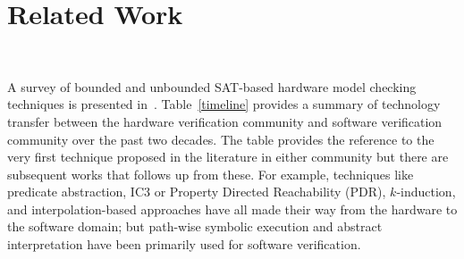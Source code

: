 \section{Related Work}~\label{related_work}
%



A survey of bounded and unbounded SAT-based hardware model checking techniques 
is presented in~\cite{charme05}.
Table~\ref{timeline} provides a summary of technology transfer between the 
hardware verification community and software verification community over the past 
two decades.  The table provides the reference to the very first technique proposed 
in the literature in either community but there are subsequent works that
follows up from these.  For example, techniques like predicate abstraction, 
IC3 or Property Directed Reachability (PDR), $k$-induction, and 
interpolation-based approaches have all made their way from the hardware 
to the software domain; but path-wise symbolic execution and abstract 
interpretation have been primarily used for software verification.
%
